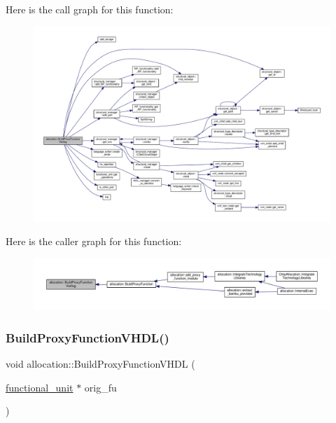 Here is the call graph for this function\+:
\nopagebreak
\begin{figure}[H]
\begin{center}
\leavevmode
\includegraphics[width=350pt]{d0/d74/classallocation_ac305b0fc0edfc7c02e39b37a5615260f_cgraph}
\end{center}
\end{figure}
Here is the caller graph for this function\+:
\nopagebreak
\begin{figure}[H]
\begin{center}
\leavevmode
\includegraphics[width=350pt]{d0/d74/classallocation_ac305b0fc0edfc7c02e39b37a5615260f_icgraph}
\end{center}
\end{figure}
\mbox{\label{classallocation_ab924181104812480fb5f27f23599487c}} 
\subsubsection{\texorpdfstring{Build\+Proxy\+Function\+V\+H\+D\+L()}{BuildProxyFunctionVHDL()}}
{\footnotesize\ttfamily void allocation\+::\+Build\+Proxy\+Function\+V\+H\+DL (\begin{DoxyParamCaption}\item[{\hyperlink{structfunctional__unit}{functional\+\_\+unit} $\ast$}]{orig\+\_\+fu }\end{DoxyParamCaption})\hspace{0.3cm}{\ttfamily [protected]}}



